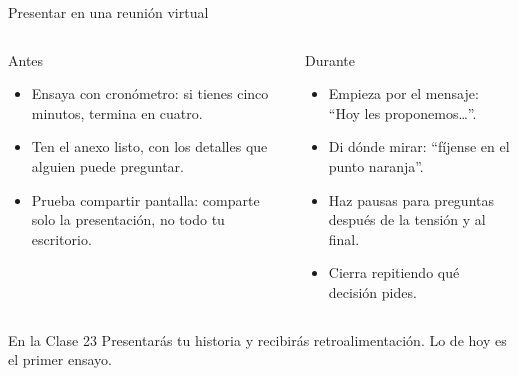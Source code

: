 \documentclass[aspectratio=169,11pt]{beamer}
\begin{document}
\begin{frame}[t]{Presentar en una reunión virtual}
  \begin{columns}[T,onlytextwidth]
    \begin{block}{Antes}
      \footnotesize
      \begin{itemize}
        \footnotesize
        \item Ensaya con cronómetro: si tienes cinco minutos, termina en
          cuatro.
        \item Ten el anexo listo, con los detalles que alguien puede
          preguntar.
        \item Prueba compartir pantalla: comparte solo la presentación, no
          todo tu escritorio.
      \end{itemize}
    \end{block}
    \begin{block}{Durante}
      \footnotesize
      \begin{itemize}
        \footnotesize
        \item Empieza por el mensaje: ``Hoy les proponemos\ldots''.
        \item Di dónde mirar: ``fíjense en el punto naranja''.
        \item Haz pausas para preguntas después de la tensión y al final.
        \item Cierra repitiendo qué decisión pides.
      \end{itemize}
    \end{block}
  \end{columns}
  \vspace{0.2cm}
  \begin{exampleblock}{En la Clase 23}
    \footnotesize Presentarás tu historia y recibirás retroalimentación.
    Lo de hoy es el primer ensayo.
  \end{exampleblock}
\end{frame}

\end{document}
